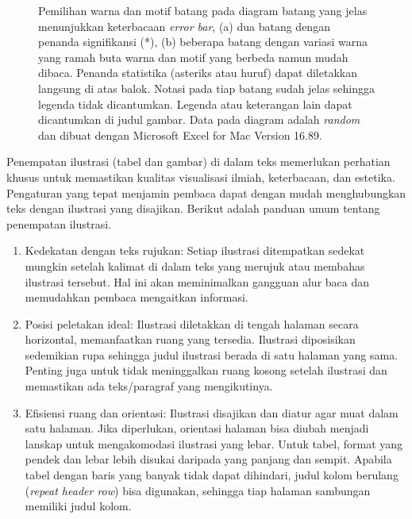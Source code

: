 \begin{figure}[H]
  \centering
  \vspace{0.65cm}
  \caption[Pemilihan warna dan motif batang pada diagram batang yang jelas
    menunjukkan keterbacaan \textit{error bar}]{Pemilihan warna dan motif
    batang pada diagram batang yang jelas
    menunjukkan keterbacaan \textit{error bar}, (a) dua batang dengan penanda
    signifikansi (*), (b) beberapa batang dengan variasi warna yang ramah buta
    warna dan motif yang berbeda namun mudah dibaca. Penanda statistika
    (asteriks atau huruf) dapat diletakkan langsung di atas balok. Notasi pada
    tiap batang sudah jelas sehingga legenda tidak dicantumkan. Legenda atau
    keterangan lain dapat dicantumkan di judul gambar. Data pada diagram adalah
    \textit{random} dan dibuat dengan Microsoft Excel for Mac Version 16.89.}
  \label{fig:diagram-batang}
\end{figure}

\clearpage

Penempatan ilustrasi (tabel dan gambar) di dalam teks memerlukan perhatian
khusus untuk memastikan kualitas visualisasi ilmiah, keterbacaan, dan estetika.
Pengaturan yang tepat menjamin pembaca dapat dengan mudah menghubungkan teks
dengan ilustrasi yang disajikan. Berikut adalah panduan umum tentang penempatan
ilustrasi.

\begin{enumerate}[label=\alph*.,leftmargin=0.75cm,labelwidth=0.5cm,
  labelsep=0.25cm,align=left,itemsep=0pt,parsep=0pt,topsep=0pt,partopsep=0pt]
  \item Kedekatan dengan teks rujukan: Setiap ilustrasi ditempatkan
    sedekat mungkin setelah kalimat di dalam teks yang merujuk atau membahas
    ilustrasi tersebut. Hal ini akan meminimalkan gangguan alur baca dan
    memudahkan pembaca mengaitkan informasi.
  \item Posisi peletakan ideal: Ilustrasi diletakkan di tengah
    halaman secara horizontal, memanfaatkan ruang yang tersedia. Ilustrasi
    diposisikan sedemikian rupa sehingga judul ilustrasi berada di satu halaman
    yang sama. Penting juga untuk tidak meninggalkan ruang kosong setelah
    ilustrasi dan memastikan ada teks/paragraf yang mengikutinya.
  \item Efisiensi ruang dan orientasi: Ilustrasi disajikan dan
    diatur agar muat dalam satu halaman. Jika diperlukan, orientasi halaman
    bisa diubah menjadi lanskap untuk mengakomodasi ilustrasi yang lebar.
    Untuk tabel, format yang pendek dan lebar lebih disukai daripada yang
    panjang dan sempit. Apabila tabel dengan baris yang banyak tidak dapat
    dihindari, judul kolom berulang (\textit{repeat header row}) bisa
    digunakan, sehingga tiap halaman sambungan memiliki judul kolom.
\end{enumerate}

